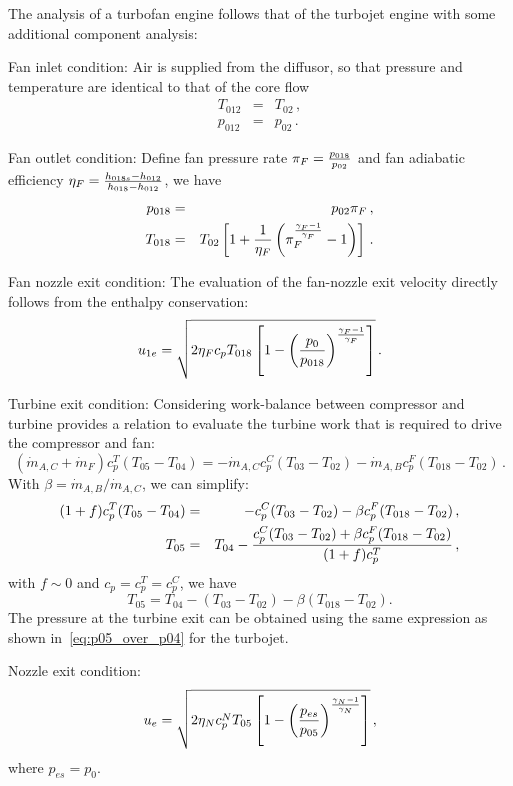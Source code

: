 The analysis of a turbofan engine follows that of the turbojet engine with some additional component analysis:
\begin{itemizePacked}
\item Fan inlet condition: Air is supplied from the diffusor, so that pressure and temperature are identical to that of the core flow
\begin{eqnarray}
T_{012} &=& T_{02}\,,\\
p_{012} &=& p_{02}\,.
\end{eqnarray}
\item Fan outlet condition: Define fan pressure rate $\pi_F = {\frac{p_{018}}{p_{02}}}$ and fan adiabatic efficiency $\eta_F = {\frac{h_{018s}-h_{012}}{h_{018}-h_{012}}}$, we have
\begin{eqnarray}
p_{018} &=& p_{02}\pi_F\,,\\
T_{018} &=& T_{02}\left[1+{\frac{1}{\eta_F}}\left(\pi_F^{\frac{\gamma_F-1}{\gamma_F}}-1\right)\right]\,.
\end{eqnarray}
\item Fan nozzle exit condition: The evaluation of the fan-nozzle exit velocity directly follows from the enthalpy conservation:
\begin{equation}
  u_{1e} = \sqrt{2\eta_F c_p T_{018} \left[1-\left({\frac{p_0}{p_{018}}}\right)^{\frac{\gamma_F-1}{\gamma_F}}\right]}\,.
\end{equation}
\item Turbine exit condition: Considering work-balance between compressor and turbine provides a relation to evaluate the turbine work that is required to drive the compressor and fan:
\begin{equation}
(\dot{m}_{A,C}+\dot{m}_F)c_p^T (T_{05}-T_{04}) = -\dot{m}_{A,C} c_p^C (T_{03}-T_{02}) -\dot{m}_{A,B} c_p^F (T_{018}-T_{02})\,.
\end{equation}
With $\beta = \dot{m}_{A,B}/\dot{m}_{A,C}$, we can simplify:
\begin{eqnarray}
(1+f) c_p^T (T_{05}-T_{04}) &=& - c_p^C (T_{03}-T_{02}) -\beta c_p^F (T_{018}-T_{02})\,,\\
T_{05} &=& T_{04} - {\frac{c_p^C(T_{03}-T_{02}) + \beta c_p^F (T_{018}-T_{02})}{(1+f)c_p^T}}\,,
\end{eqnarray}
with $f \sim 0$ and $c_p = c_p^T = c_p^C$, we have
\begin{equation}
	T_{05} = T_{04} - (T_{03}-T_{02})-\beta(T_{018}-T_{02}).
\end{equation}
The pressure at the turbine exit can be obtained using the same expression as shown in~\cref{eq:p05_over_p04} for the turbojet.
\item Nozzle exit condition:
\[
  u_e = \sqrt{2 \eta_N c_p^N T_{05} \left[ 1 - \left({\frac{p_{es}}{p_{05}}}\right)^{\frac{\gamma_N-1}{\gamma_N}}\right]}\,,
\]
where $p_{es} = p_0$.
\end{itemizePacked}
